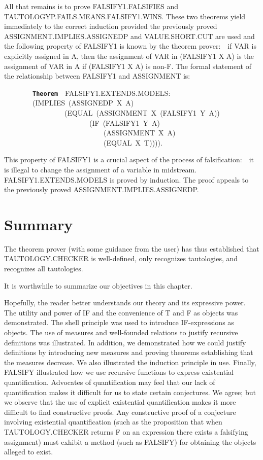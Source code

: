 \documentclass[11pt]{book}
\newenvironment{pubasis}{\begin{flushleft}\ttfamily\small}{\normalsize\rmfamily\end{flushleft}}
\newcommand{\axiomordefinition}[1]{\vspace{6pt}\texttt{\textbf{#1}}}
\newcommand{\pubdefaulttextsize}{\large}
\begin{document}
All that remains is to prove FAL\-SI\-FY1.FALSIFIES
and TAU\-TOL\-OGYP.FAILS.MEANS.FAL\-SI\-FY1.WINS.  These two theorems
yield immediately to the correct induction provided the previously
proved ASSIGN\-MENT.IMPLIES.ASSIGNEDP and VALUE.SHORT.CUT are used and
the following property of FALSIFY1 is known by the theorem prover:~~if VAR is explicitly assigned in A, then the
assignment of VAR in (FALSIFY1 X A) is the assignment of VAR in
A if (FALSIFY1 X A) is non-F.
The formal statement of the relationship between FALSIFY1 and ASSIGNMENT
is:
\begin{pubasis}
~~~~~~~~\axiomordefinition{Theorem}~~FAL\-SI\-FY1.EXTENDS.MODELS:\\
~~~~~~~~(IMPLIES~(ASSIGNEDP~X~A)\\
~~~~~~~~~~~~~~~~~(EQUAL~(ASSIGNMENT~X~(FALSIFY1~Y~A))\\
~~~~~~~~~~~~~~~~~~~~~~~~(IF~(FALSIFY1~Y~A)\\
~~~~~~~~~~~~~~~~~~~~~~~~~~~~(ASSIGNMENT~X~A)\\
~~~~~~~~~~~~~~~~~~~~~~~~~~~~(EQUAL~X~T)))).\\
\end{pubasis}
This property of FALSIFY1 is a crucial aspect of the process of
falsification:~~it is illegal to change the assignment of a
variable in midstream.  FAL\-SI\-FY1.EXTENDS.MODELS is proved by induction.
The proof appeals to the previously proved ASSIGN\-MENT.IMPLIES.ASSIGNEDP.
\section{Summary}
\pubdefaulttextsize
The theorem prover (with some guidance from the user) has
thus established that TAU\-TOL\-OGY.CHECK\-ER is well-defined, only recognizes
tautologies, and recognizes all tautologies.

It is worthwhile to summarize our objectives in this chapter.

Hopefully, the reader better understands our theory and 
its expressive power.  The utility and power of IF
and the convenience of T and F as objects was demonstrated.
The shell principle was used to introduce IF-expressions as objects.  The use of measures
and well-founded relations to justify recursive definitions was illustrated.
In addition, we demonstrated how we could justify definitions by introducing
new measures and proving theorems establishing that the measures decrease.
We also illustrated the induction principle in use.
Finally, FALSIFY illustrated
how we use recursive functions to express existential quantification.
Advocates of quantification may feel that our lack of quantification makes
it difficult for us to state certain conjectures.  We agree; but we
observe that the use of explicit existential quantification
makes it more difficult to find constructive proofs.  Any constructive
proof of a conjecture involving existential quantification (such as the
proposition that when TAU\-TOL\-OGY.CHECK\-ER returns F on an
expression there exists a falsifying assignment)
must exhibit a method (such as FALSIFY)
for obtaining the objects alleged to exist.
\end{document}
